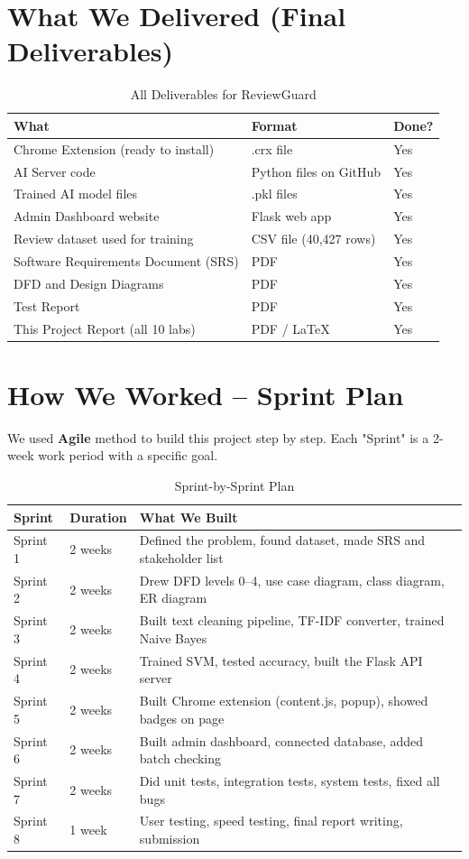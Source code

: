 \documentclass[10pt, a4paper]{report}
\begin{document}
\section{What We Delivered (Final Deliverables)}

\begin{table}[H]
\centering
\caption{All Deliverables for ReviewGuard}
\begin{tabular}{lll}
\toprule
\textbf{What} & \textbf{Format} & \textbf{Done?} \\
\midrule
Chrome Extension (ready to install) & .crx file & Yes \\
AI Server code & Python files on GitHub & Yes \\
Trained AI model files & .pkl files & Yes \\
Admin Dashboard website & Flask web app & Yes \\
Review dataset used for training & CSV file (40,427 rows) & Yes \\
Software Requirements Document (SRS) & PDF & Yes \\
DFD and Design Diagrams & PDF & Yes \\
Test Report & PDF & Yes \\
This Project Report (all 10 labs) & PDF / LaTeX & Yes \\
\bottomrule
\end{tabular}
\end{table}

\section{How We Worked -- Sprint Plan}

We used \textbf{Agile} method to build this project step by step. Each "Sprint" is a 2-week work period with a specific goal.

\begin{table}[H]
\centering
\caption{Sprint-by-Sprint Plan}
\begin{tabularx}{\textwidth}{llX}
\toprule
\textbf{Sprint} & \textbf{Duration} & \textbf{What We Built} \\
\midrule
Sprint 1 & 2 weeks & Defined the problem, found dataset, made SRS and stakeholder list \\
Sprint 2 & 2 weeks & Drew DFD levels 0--4, use case diagram, class diagram, ER diagram \\
Sprint 3 & 2 weeks & Built text cleaning pipeline, TF-IDF converter, trained Naive Bayes \\
Sprint 4 & 2 weeks & Trained SVM, tested accuracy, built the Flask API server \\
Sprint 5 & 2 weeks & Built Chrome extension (content.js, popup), showed badges on page \\
Sprint 6 & 2 weeks & Built admin dashboard, connected database, added batch checking \\
Sprint 7 & 2 weeks & Did unit tests, integration tests, system tests, fixed all bugs \\
Sprint 8 & 1 week & User testing, speed testing, final report writing, submission \\
\bottomrule
\end{tabularx}
\end{table}
\end{document}

